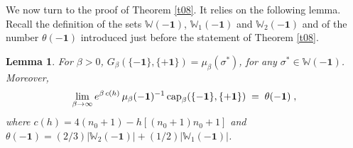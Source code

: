 \documentclass[reqno]{amsart}
\newtheorem{lemma}[theorem]{Lemma}
\begin{document}
We now turn to the proof of Theorem \ref{t08}. It relies on the
following lemma.  Recall the definition of the sets ${{\mathbb W}}(-{{\mathbf 1}})$,
${{\mathbb W}}_1(-{{\mathbf 1}})$ and ${{\mathbb W}}_2(-{{\mathbf 1}})$ and of the number $\theta(-{{\mathbf 1}})$ introduced just before the statement of Theorem \ref{t08}.

\begin{lemma}
\label{t07}
For $\beta>0$, $G_\beta (\{-{{\mathbf 1}}\}, \{+{{\mathbf 1}}\}) = \mu_\beta
(\sigma^*)$, for any $\sigma^* \in {{\mathbb W}}(-{{\mathbf 1}})$.
Moreover,
\begin{equation*}
\lim_{\beta\to\infty}  e^{\beta \, c(h)} \, \mu_\beta
(-{{\mathbf 1}})^{-1} \, {{\rm cap}}_\beta(\{- {{\mathbf 1}}\} , \{+{{\mathbf 1}}\}) \;=\; 
\theta(-{{\mathbf 1}})\;, 
\end{equation*}
where $c(h) = 4 (n_0+1) - h [(n_0+1)n_0+1]$ and $\theta(-{{\mathbf 1}}) =
(2/3) |{{\mathbb W}}_2(-{{\mathbf 1}})| + (1/2) |{{\mathbb W}}_1(-{{\mathbf 1}})|$.
\end{lemma}
\end{document}
